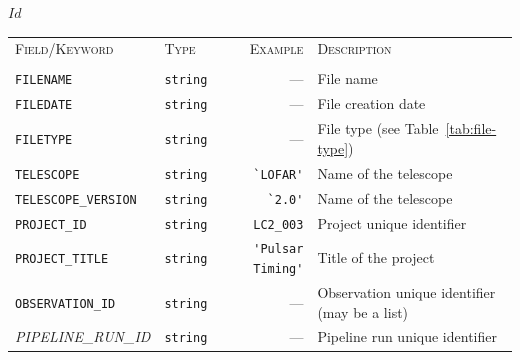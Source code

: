 \svnInfo $Id$

\begin{table}[htbp]
  \centering
  \begin{tabular}{|lp{1.5cm}rp{5cm}|}


    \hline
    \textsc{Field/Keyword} & \textsc{Type} & \textsc{Example} & \textsc{Description} \\
     &  &   & \\
    \hline \hline


    \small \verb|FILENAME| & \small\verb|string| & ---  &  File name \\
    \small \verb|FILEDATE| & \small\verb|string| & ---  &  File creation date \\
    \small \verb|FILETYPE| & \small\verb|string| & ---  &  File type (see Table~\ref{tab:file-type}) \\
    \small \verb|TELESCOPE| & \small\verb|string| & \verb|`LOFAR'|  &  Name of the telescope \\
    \small \verb|TELESCOPE_VERSION| & \small\verb|string| & \verb|`2.0'|  &  Name of the telescope \\
    \small \verb|PROJECT_ID| & \small\verb|string| & \verb|LC2_003|  &  Project unique identifier \\
    \small \verb|PROJECT_TITLE| & \small\verb|string| & \verb|'Pulsar Timing'|  &  Title of the project \\
    \small \verb|OBSERVATION_ID| & \small\verb|string| & ---  &  Observation unique identifier (may be a list) \\
    \small{\textit{PIPELINE\_RUN\_ID}} & \small\verb|string| & ---  &  Pipeline run unique identifier \\

\end{tabular}
\end{table}

